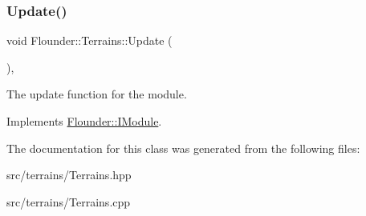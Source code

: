 \subsubsection{\texorpdfstring{Update()}{Update()}}
{\footnotesize\ttfamily void Flounder\+::\+Terrains\+::\+Update (\begin{DoxyParamCaption}{ }\end{DoxyParamCaption})\hspace{0.3cm}{\ttfamily [override]}, {\ttfamily [virtual]}}



The update function for the module. 



Implements \hyperlink{class_flounder_1_1_i_module_a1812bb03a6990e4698a10c043fa25fde}{Flounder\+::\+I\+Module}.



The documentation for this class was generated from the following files\+:\begin{DoxyCompactItemize}
\item 
src/terrains/Terrains.\+hpp\item 
src/terrains/Terrains.\+cpp\end{DoxyCompactItemize}
